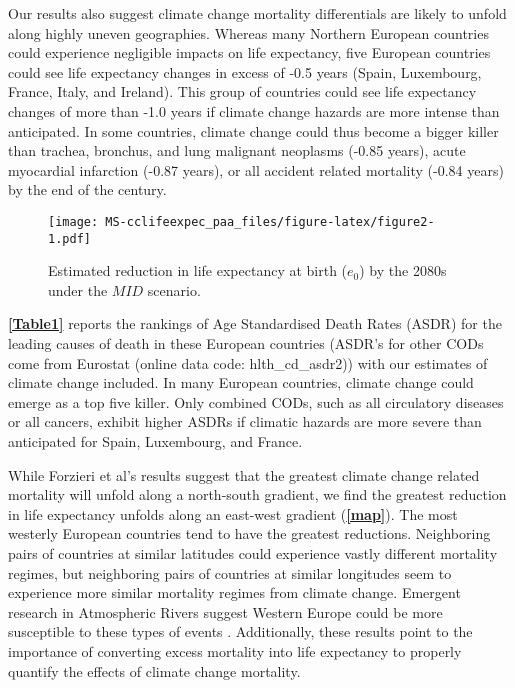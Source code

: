 \documentclass[12pt,]{article}
\makeatletter
\def\maxwidth{\ifdim\Gin@nat@width>\linewidth\linewidth
\else\Gin@nat@width\fi}
\let\Oldincludegraphics\includegraphics
\renewcommand{\includegraphics}[1]{\Oldincludegraphics[width=\maxwidth]{#1}}
\makeatother
\begin{document}
Our results also suggest climate change mortality differentials are
likely to unfold along highly uneven geographies. Whereas many Northern
European countries could experience negligible impacts on life
expectancy, five European countries could see life expectancy changes in
excess of -0.5 years (Spain, Luxembourg, France, Italy, and Ireland).
This group of countries could see life expectancy changes of more than
-1.0 years if climate change hazards are more intense than anticipated.
In some countries, climate change could thus become a bigger killer than
trachea, bronchus, and lung malignant neoplasms (-0.85 years), acute
myocardial infarction (-0.87 years), or all accident related mortality
(-0.84 years) \citep{arias2013united} by the end of the century.

\begin{figure}
\centering
\texttt{[image: MS-cclifeexpec\_paa\_files/figure-latex/figure2-1.pdf]}
\caption{Estimated reduction in life expectancy at birth (\(e_0\)) by
the 2080s under the \(MID\) scenario.\label{map}}
\end{figure}

\textbf{\autoref{Table1}} reports the rankings of Age Standardised Death
Rates (ASDR) for the leading causes of death in these European countries
(ASDR's for other CODs come from Eurostat (online data code:
hlth\_cd\_asdr2)) with our estimates of climate change included. In many
European countries, climate change could emerge as a top five killer.
Only combined CODs, such as all circulatory diseases or all cancers,
exhibit higher ASDRs if climatic hazards are more severe than
anticipated for Spain, Luxembourg, and France.

While Forzieri et al's \citep{forzieri2017increasing} results suggest
that the greatest climate change related mortality will unfold along a
north-south gradient, we find the greatest reduction in life expectancy
unfolds along an east-west gradient (\textbf{\autoref{map}}). The most
westerly European countries tend to have the greatest reductions.
Neighboring pairs of countries at similar latitudes could experience
vastly different mortality regimes, but neighboring pairs of countries
at similar longitudes seem to experience more similar mortality regimes
from climate change. Emergent research in Atmospheric Rivers suggest
Western Europe could be more susceptible to these types of events
\citep{ramos2015daily}. Additionally, these results point to the
importance of converting excess mortality into life expectancy to
properly quantify the effects of climate change mortality.
\end{document}
